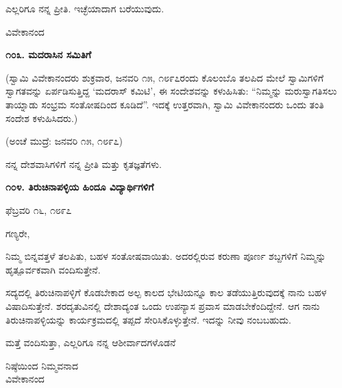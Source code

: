 ಎಲ್ಲರಿಗೂ ನನ್ನ ಪ್ರೀತಿ. ಇಚ್ಛೆಯಾದಾಗ ಬರೆಯುವುದು.

\begin{flushright}
ವಿವೇಕಾನಂದ
\end{flushright}

\begin{center}
\textbf{೧೦೩. ಮದರಾಸಿನ ಸಮಿತಿಗೆ}
\end{center}

\begin{flushright}
(ಸ್ವಾಮಿ ವಿವೇಕಾನಂದರು ಶುಕ್ರವಾರ, ಜನವರಿ ೧೫, ೧೮೯೭ರಂದು ಕೊಲಂಬೊ ತಲಪಿದ ಮೇಲೆ ಸ್ವಾಮಿಗಳಿಗೆ ಸ್ವಾಗತವನ್ನು ಏರ್ಪಡಿಸುತ್ತಿದ್ದ ‘ಮದರಾಸ್ ಕಮಿಟಿ’, ಈ ಸಂದೇಶವನ್ನು ಕಳುಹಿಸಿತು: “ನಿಮ್ಮನ್ನು ಮರುಸ್ವಾಗತಿಸಲು ತಾಯ್ನಾಡು ಸಂಭ್ರಮ ಸಂತೋಷದಿಂದ ಕೂಡಿದೆ”. ಇದಕ್ಕೆ ಉತ್ತರವಾಗಿ, ಸ್ವಾಮಿ ವಿವೇಕಾನಂದರು ಒಂದು ತಂತಿ ಸಂದೇಶ ಕಳುಹಿಸಿದರು.)
\end{flushright}

\begin{flushright}
(ಅಂಚೆ ಮುದ್ರೆ: ಜನವರಿ ೧೫, ೧೮೯೭)
\end{flushright}

ನನ್ನ ದೇಶವಾಸಿಗಳಿಗೆ ನನ್ನ ಪ್ರೀತಿ ಮತ್ತು ಕೃತಜ್ಞತೆಗಳು.

\begin{center}
\textbf{೧೦೪. ತಿರುಚಿನಾಪಳ್ಳಿಯ ಹಿಂದೂ ವಿದ್ಯಾರ್ಥಿಗಳಿಗೆ}
\end{center}

\begin{flushright}
ಫೆಬ್ರವರಿ ೧೬, ೧೮೯೭
\end{flushright}

ಗಣ್ಯರೇ,

ನಿಮ್ಮ ಬಿನ್ನವತ್ತಳೆ ತಲಪಿತು, ಬಹಳ ಸಂತೋಷವಾಯಿತು. ಅದರಲ್ಲಿರುವ ಕರುಣಾ ಪೂರ್ಣ ಶಬ್ದಗಳಿಗೆ ನಿಮ್ಮನ್ನು ಹೃತ್ಪೂರ್ವಕವಾಗಿ ವಂದಿಸುತ್ತೇನೆ.

ಸದ್ಯದಲ್ಲಿ ತಿರುಚಿನಾಪಳ್ಳಿಗೆ ಕೊಡಬೇಕಾದ ಅಲ್ಪ ಕಾಲದ ಭೇಟಿಯನ್ನೂ ಕಾಲ ತಡೆಯುತ್ತಿರುವುದಕ್ಕೆ ನಾನು ಬಹಳ ವಿಷಾದಿಸುತ್ತೇನೆ. ಶರದೃತುವಿನಲ್ಲಿ ದೇಶಾದ್ಯಂತ ಒಂದು ಉಪನ್ಯಾಸ ಪ್ರವಾಸ ಮಾಡಬೇಕೆಂದಿದ್ದೇನೆ. ಆಗ ನಾನು ತಿರುಚಿನಾಪಳ್ಳಿಯನ್ನು ಕಾರ್ಯಕ್ರಮದಲ್ಲಿ ತಪ್ಪದೆ ಸೇರಿಸಿಕೊಳ್ಳುತ್ತೇನೆ. ಇದನ್ನು ನೀವು ನಂಬಬಹುದು.

ಮತ್ತೆ ವಂದಿಸುತ್ತಾ, ಎಲ್ಲರಿಗೂ ನನ್ನ ಆಶೀರ್ವಾದಗಳೊಡನೆ

\begin{flushright}
ನಿಷ್ಠೆಯಿಂದ ನಿಮ್ಮವನಾದ\\ವಿವೇಕಾನಂದ
\end{flushright}

